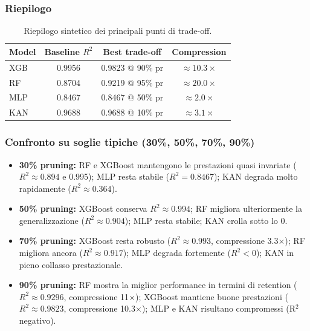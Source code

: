 \documentclass[a4paper,12pt]{report}
\begin{document}
	\subsubsection{Riepilogo}
	\begin{table}[H]
		\centering
		\begin{tabular}{lccc}
			\toprule
			\textbf{Model} & \textbf{Baseline \(R^2\)} & \textbf{Best trade-off} & \textbf{Compression} \\
			\midrule
			XGB           & 0.9956 & 0.9823 @ 90\% pr & \(\approx 10.3\times\) \\
			RF            & 0.8704 & 0.9219 @ 95\% pr & \(\approx 20.0\times\) \\
			MLP           & 0.8467 & 0.8467 @ 50\% pr & \(\approx 2.0\times\) \\
			KAN           & 0.9688 & 0.9688 @ 10\% pr & \(\approx 3.1\times\) \\
			\bottomrule
		\end{tabular}
		\caption{Riepilogo sintetico dei principali punti di trade-off.}
	\end{table}
	
	\subsubsection{Confronto su soglie tipiche (30\%, 50\%, 70\%, 90\%)}
	\begin{itemize}
		\item \textbf{30\% pruning:} RF e XGBoost mantengono le prestazioni quasi invariate (\(R^2 \approx 0.894\) e 0.995); MLP resta stabile (\(R^2 = 0.8467\)); KAN degrada molto rapidamente (\(R^2 \approx 0.364\)).
		\item \textbf{50\% pruning:} XGBoost conserva \(R^2 \approx 0.994\); RF migliora ulteriormente la generalizzazione (\(R^2 \approx 0.904\)); MLP resta stabile; KAN crolla sotto lo 0.
		\item \textbf{70\% pruning:} XGBoost resta robusto (\(R^2 \approx 0.993\), compressione 3.3$\times$); RF migliora ancora (\(R^2 \approx 0.917\)); MLP degrada fortemente (\(R^2 < 0\)); KAN in pieno collasso prestazionale.
		\item \textbf{90\% pruning:} RF mostra la miglior performance in termini di retention (\(R^2 \approx 0.9296\), compressione 11$\times$); XGBoost mantiene buone prestazioni (\(R^2 \approx 0.9823\), compressione 10.3$\times$); MLP e KAN risultano compromessi (R\(^2\) negativo).
	\end{itemize}
	
\end{document}
